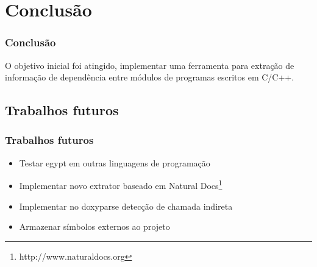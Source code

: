 \documentclass{beamer}
\begin{document}
\section{Conclusão}

\begin{frame}
\frametitle{Conclusão}
 O objetivo inicial foi atingido, implementar uma ferramenta para extração de
 informação de dependência entre módulos de programas escritos em C/C++.
\end{frame}

\subsection{Trabalhos futuros}

\begin{frame}
\frametitle{Trabalhos futuros}
 \begin{itemize}
 \item Testar egypt em outras linguagens de programação
 \item Implementar novo extrator baseado em Natural Docs\footnote{http://www.naturaldocs.org}
 \item Implementar no doxyparse detecção de chamada indireta
 \item Armazenar símbolos externos ao projeto
 \end{itemize}
\end{frame}
\end{document}
